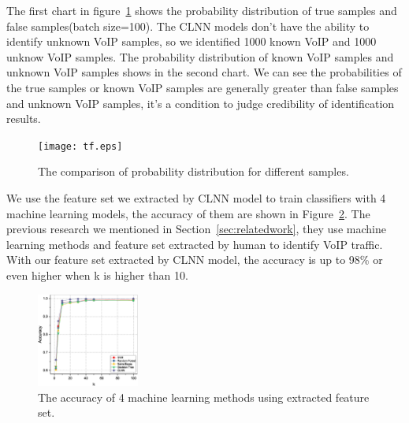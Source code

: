 \documentclass[conference]{IEEEtran}
\begin{document}

The first chart in figure~\ref{fig:tf} shows the probability distribution of true samples and false samples(batch size=100). The CLNN models don't have the ability to identify unknown VoIP samples, so we identified 1000 known VoIP and 1000 unknow VoIP samples. The probability distribution of known VoIP samples and unknown VoIP samples shows in the second chart. We can see the probabilities of the true samples or known VoIP samples are generally greater than false samples and unknown VoIP samples, it's a condition to judge credibility of identification results.
\begin{figure}[htp]
\begin{center}
\texttt{[image: tf.eps]}
\caption{The comparison of probability distribution for different samples.}\label{fig:tf}
\end{center}
\end{figure}

We use the feature set we extracted by CLNN model to train classifiers with 4 machine learning models, the accuracy of them are shown in Figure~\ref{fig:ml}. The previous research we mentioned in Section~\ref{sec:relatedwork}, they use machine learning methods and feature set extracted by human to identify VoIP traffic. With our feature set extracted by CLNN model, the accuracy is up to 98\% or even higher when k is higher than 10.
\begin{figure}
  \centering
  \includegraphics[width=0.3\textwidth]{ml.eps}
  \caption{The accuracy of 4 machine learning methods using extracted feature set.}
  \label{fig:ml}
\end{figure}
\end{document}
